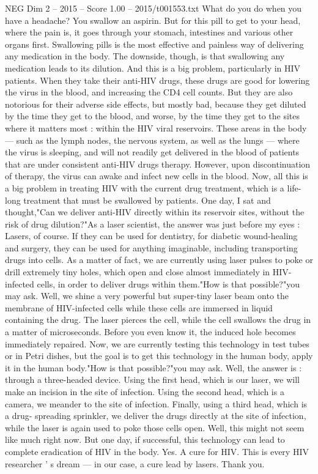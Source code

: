 \begin{textsample}{NEG Dim 2 – 2015 – Score 1.00 – 2015/t001553.txt}  \label{ex:f2_neg_038}
What do you do when you have a headache?
You swallow an aspirin.
But for this pill to get to your head, where the pain is, it goes through your stomach, intestines and various other organs first.
Swallowing pills is the most effective and painless way of delivering any medication in the body.
The downside, though, is that swallowing any medication leads to its dilution.
And this is a big problem, particularly in HIV patients.
When they take their anti-HIV drugs, these drugs are good for lowering the virus in the blood, and increasing the CD4 cell counts.
But they are also notorious for their adverse side effects, but mostly bad, because they get diluted by the time they get to the blood, and worse, by the time they get to the sites where it matters most : within the HIV viral reservoirs.
These areas in the body — such as the lymph nodes, the nervous system, as well as the lungs — where the virus is sleeping, and will not readily get delivered in the blood of patients that are under consistent anti-HIV drugs therapy.
However, upon discontinuation of therapy, the virus can awake and infect new cells in the blood.
Now, all this is a big problem in treating HIV with the current drug treatment, which is a life-long treatment that must be swallowed by patients.
One day, I sat and thought,"Can we deliver anti-HIV directly within its reservoir sites, without the risk of drug dilution?"As a laser scientist, the answer was just before my eyes : Lasers, of course.
If they can be used for dentistry, for diabetic wound-healing and surgery, they can be used for anything imaginable, including transporting drugs into cells.
As a matter of fact, we are currently using laser pulses to poke or drill extremely tiny holes, which open and close almost immediately in HIV-infected cells, in order to deliver drugs within them."How is that possible?"you may ask.
Well, we shine a very powerful but super-tiny laser beam onto the membrane of HIV-infected cells while these cells are immersed in liquid containing the drug.
The laser pierces the cell, while the cell swallows the drug in a matter of microseconds.
Before you even know it, the induced hole becomes immediately repaired.
Now, we are currently testing this technology in test tubes or in Petri dishes, but the goal is to get this technology in the human body, apply it in the human body."How is that possible?"you may ask.
Well, the answer is : through a three-headed device.
Using the first head, which is our laser, we will make an incision in the site of infection.
Using the second head, which is a camera, we meander to the site of infection.
Finally, using a third head, which is a drug- spreading sprinkler, we deliver the drugs directly at the site of infection, while the laser is again used to poke those cells open.
Well, this might not seem like much right now.
But one day, if successful, this technology can lead to complete eradication of HIV in the body.
Yes.
A cure for HIV.
This is every HIV researcher ' s dream — in our case, a cure lead by lasers.
Thank you.

\end{textsample}
